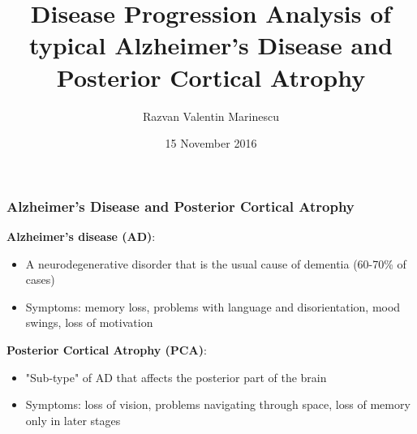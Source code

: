 \documentclass[10pt,xcolor=table]{beamer}
\title{Disease Progression Analysis of typical Alzheimer’s Disease and Posterior Cortical Atrophy}
\author{Razvan Valentin Marinescu}
\institute{Center for Medical Image Computing, University College London}
\date{15 November 2016}
\begin{document}
 
\frame{\titlepage}
 


\begin{frame}
\frametitle{Alzheimer's Disease and Posterior Cortical Atrophy}

\textbf{Alzheimer's disease (AD)}:
\begin{itemize}
 \item A neurodegenerative disorder that is the usual cause of dementia (60-70\% of cases)
 \item Symptoms: memory loss, problems with language and disorientation, mood swings, loss of motivation
\end{itemize}

\textbf{Posterior Cortical Atrophy (PCA)}:
\begin{itemize}
 \item "Sub-type" of AD that affects the posterior part of the brain
 \item Symptoms: loss of vision, problems navigating through space, loss of memory only in later stages
\end{itemize}


\end{frame}
\end{document}
